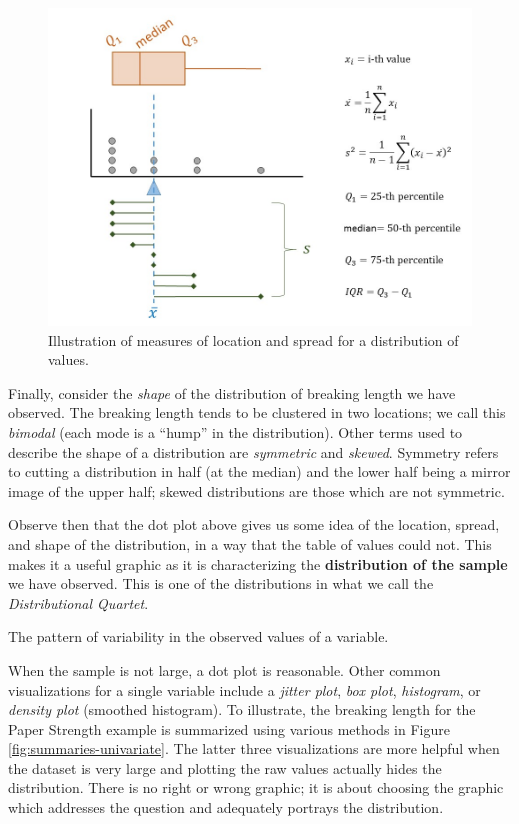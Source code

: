 \documentclass[]{book}
\theoremstyle{definition}
\theoremstyle{definition}
\theoremstyle{remark}
\let\BeginKnitrBlock\begin \let\EndKnitrBlock\end
\begin{document}
\begin{figure}

{\centering \includegraphics[width=0.8\linewidth]{./images/Summaries-Summaries} 

}

\caption{Illustration of measures of location and spread for a distribution of values.}\label{fig:summaries-summaries}
\end{figure}

Finally, consider the \emph{shape} of the distribution of breaking
length we have observed. The breaking length tends to be clustered in
two locations; we call this \emph{bimodal} (each mode is a ``hump'' in
the distribution). Other terms used to describe the shape of a
distribution are \emph{symmetric} and \emph{skewed}. Symmetry refers to
cutting a distribution in half (at the median) and the lower half being
a mirror image of the upper half; skewed distributions are those which
are not symmetric.

Observe then that the dot plot above gives us some idea of the location,
spread, and shape of the distribution, in a way that the table of values
could not. This makes it a useful graphic as it is characterizing the
\textbf{distribution of the sample} we have observed. This is one of the
distributions in what we call the \emph{Distributional Quartet}.

\BeginKnitrBlock{definition}[Distribution of the Sample]
\protect\hypertarget{def:defn-distribution-sample}{}{\label{def:defn-distribution-sample}
{} }The pattern of variability
in the observed values of a variable.
\EndKnitrBlock{definition}

When the sample is not large, a dot plot is reasonable. Other common
visualizations for a single variable include a \emph{jitter plot},
\emph{box plot}, \emph{histogram}, or \emph{density plot} (smoothed
histogram). To illustrate, the breaking length for the Paper Strength
example is summarized using various methods in Figure
\ref{fig:summaries-univariate}. The latter three visualizations are more
helpful when the dataset is very large and plotting the raw values
actually hides the distribution. There is no right or wrong graphic; it
is about choosing the graphic which addresses the question and
adequately portrays the distribution.
\end{document}
